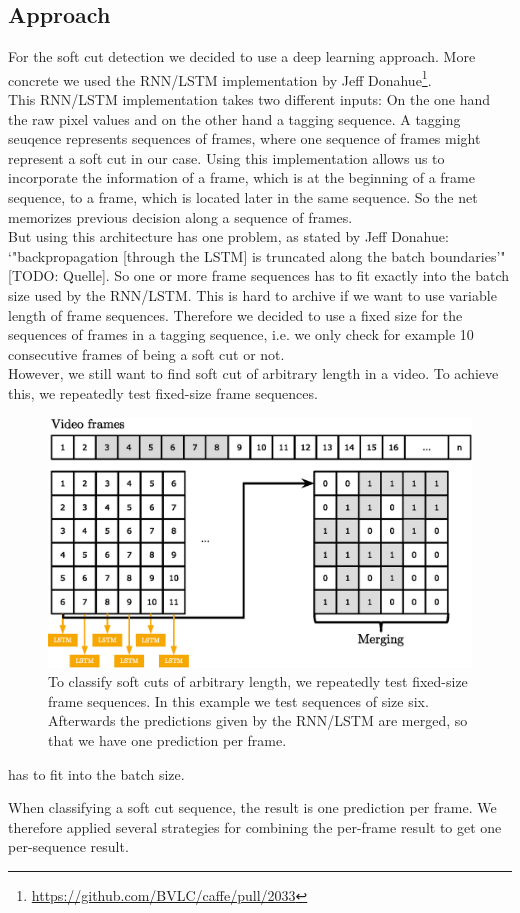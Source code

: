 \subsection{Approach}
\label{sec:soft_cut_approach}

For the soft cut detection we decided to use a deep learning approach.
More concrete we used the RNN/LSTM implementation by Jeff Donahue\footnote{\url{https://github.com/BVLC/caffe/pull/2033}}. \\
This RNN/LSTM implementation takes two different inputs: On the one hand the raw pixel values and on the other hand a tagging sequence.
A tagging seuqence represents sequences of frames, where one sequence of frames might represent a soft cut in our case.
Using this implementation allows us to incorporate the information of a frame, which is at the beginning of a frame sequence, to a frame, which is located later in the same sequence.
So the net memorizes previous decision along a sequence of frames. \\
But using this architecture has one problem, as stated by Jeff Donahue: `"backpropagation [through the LSTM] is truncated along the batch boundaries'" [TODO: Quelle].
So one or more frame sequences has to fit exactly into the batch size used by the RNN/LSTM.
This is hard to archive if we want to use variable length of frame sequences.
Therefore we decided to use a fixed size for the sequences of frames in a tagging sequence, i.e. we only check for example 10 consecutive frames of being a soft cut or not.  \\
However, we still want to find soft cut of arbitrary length in a video.
To achieve this, we repeatedly test fixed-size frame sequences.

\begin{figure}[!htb]
	\centering
	\includegraphics[scale=.7]{images/soft_cut_approach.eps}
	\caption{To classify soft cuts of arbitrary length, we repeatedly test fixed-size frame sequences. In this example we test sequences of size six. Afterwards the predictions given by the RNN/LSTM are merged, so that we have one prediction per frame.}
	\label{fig:soft_cut_approach}
\end{figure}

 has to fit into the batch size.



When classifying a soft cut sequence, the result is one prediction per frame.
We therefore applied several strategies for combining the per-frame result to get one per-sequence result.

